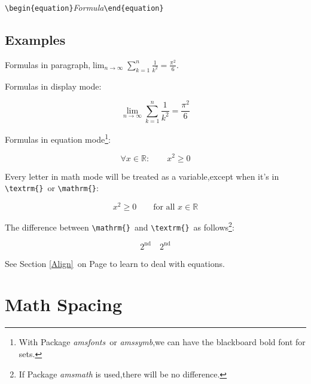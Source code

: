 \documentclass[a4paper]{report}
\begin{document}
\verb|\begin{equation}|\emph{Formula}\verb|\end{equation}|

\subsection{Examples}
Formulas in paragraph,$\lim_{n \to \infty} \sum_{k=1}^n
\frac{1}{k^2} = \frac{\pi^2}{6}$.

Formulas in display mode:

\begin{displaymath}
\lim_{n \to \infty} \sum_{k=1}^n \frac{1}{k^2} = \frac{\pi^2}{6}
\end{displaymath}

Formulas in equation mode\footnote{With Package \emph{amsfonts}\ or
\emph{amssymb},we can have the blackboard bold font for sets.}:

\begin{equation}
\forall x \in \mathbb{R}: \qquad x^{2} \geq 0
\end{equation}

Every letter in math mode will be treated as a variable,except when
it's in \verb|\textrm{}|\ or \verb|\mathrm{}|:

\begin{equation}
x^{2} \geq 0\qquad \textrm{for all }x\in\mathbb{R}
\end{equation}

The difference between \verb|\mathrm{}|\ and \verb|\textrm{}|\ as
follows\footnote{If Package \emph{amsmath} is used,there will be no
difference.}:

\begin{equation}
2^{\textrm{nd}} \quad 2^{\mathrm{nd}}
\end{equation}

See Section \ref{Align}\ on Page \pageref{Align} to learn to deal
with equations.

\section{Math Spacing}
\end{document}
